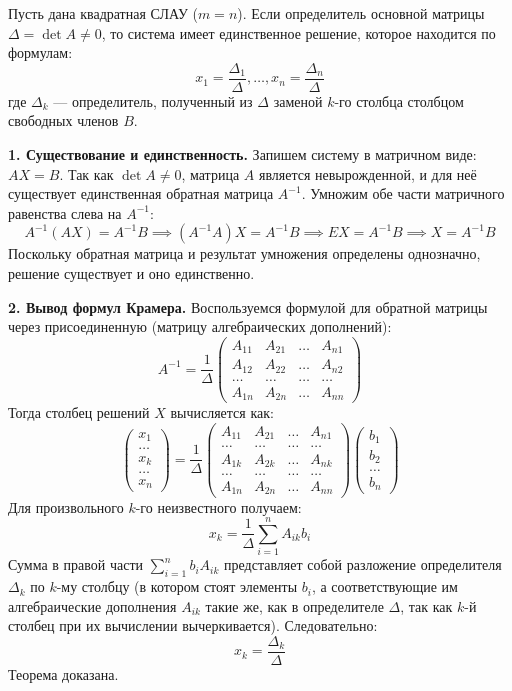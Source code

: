 \begin{theorem}[Крамера]
Пусть дана квадратная СЛАУ ($m = n$). Если определитель основной матрицы $\Delta = \det A \neq 0$, то система имеет единственное решение, которое находится по формулам:
\[ x_1 = \frac{\Delta_1}{\Delta}, \dots, x_n = \frac{\Delta_n}{\Delta} \]
где $\Delta_k$ — определитель, полученный из $\Delta$ заменой $k$-го столбца столбцом свободных членов $B$.
\end{theorem}

\begin{tcolorbox}[title=Доказательство, breakable]
\textbf{1. Существование и единственность.}
Запишем систему в матричном виде: $AX = B$. Так как $\det A \neq 0$, матрица $A$ является невырожденной, и для неё существует единственная обратная матрица $A^{-1}$. Умножим обе части матричного равенства слева на $A^{-1}$:
\[ A^{-1}(AX) = A^{-1}B \implies (A^{-1}A)X = A^{-1}B \implies EX = A^{-1}B \implies X = A^{-1}B \]
Поскольку обратная матрица и результат умножения определены однозначно, решение существует и оно единственно.

\textbf{2. Вывод формул Крамера.}
Воспользуемся формулой для обратной матрицы через присоединенную (матрицу алгебраических дополнений):
\[ A^{-1} = \frac{1}{\Delta} \begin{pmatrix} A_{11} & A_{21} & \dots & A_{n1} \\ A_{12} & A_{22} & \dots & A_{n2} \\ \dots & \dots & \dots & \dots \\ A_{1n} & A_{2n} & \dots & A_{nn} \end{pmatrix} \]
Тогда столбец решений $X$ вычисляется как:
\[ \begin{pmatrix} x_1 \\ \dots \\ x_k \\ \dots \\ x_n \end{pmatrix} = \frac{1}{\Delta} \begin{pmatrix} A_{11} & A_{21} & \dots & A_{n1} \\ \dots & \dots & \dots & \dots \\ A_{1k} & A_{2k} & \dots & A_{nk} \\ \dots & \dots & \dots & \dots \\ A_{1n} & A_{2n} & \dots & A_{nn} \end{pmatrix} \begin{pmatrix} b_1 \\ b_2 \\ \dots \\ b_n \end{pmatrix} \]
Для произвольного $k$-го неизвестного получаем:
\[ x_k = \frac{1}{\Delta} \sum_{i=1}^n A_{ik} b_i \]
Сумма в правой части $\sum_{i=1}^n b_i A_{ik}$ представляет собой разложение определителя $\Delta_k$ по $k$-му столбцу (в котором стоят элементы $b_i$, а соответствующие им алгебраические дополнения $A_{ik}$ такие же, как в определителе $\Delta$, так как $k$-й столбец при их вычислении вычеркивается).
Следовательно:
\[ x_k = \frac{\Delta_k}{\Delta} \]
Теорема доказана.
\end{tcolorbox}

